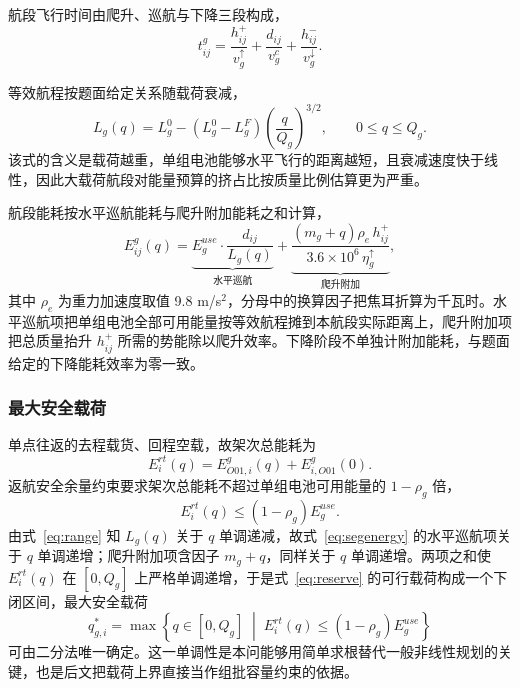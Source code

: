 \documentclass[bwprint]{gmcmthesis}
\begin{document}
航段飞行时间由爬升、巡航与下降三段构成，
\begin{equation}
t_{ij}^{g}=\frac{h_{ij}^{+}}{v_g^{\uparrow}}+\frac{d_{ij}}{v_g^{c}}+\frac{h_{ij}^{-}}{v_g^{\downarrow}}.
\label{eq:segtime}
\end{equation}

等效航程按题面给定关系随载荷衰减，
\begin{equation}
L_g(q)=L_g^{0}-\left(L_g^{0}-L_g^{F}\right)\left(\frac{q}{Q_g}\right)^{3/2},\qquad 0\le q\le Q_g .
\label{eq:range}
\end{equation}
该式的含义是载荷越重，单组电池能够水平飞行的距离越短，且衰减速度快于线性，因此大载荷航段对能量预算的挤占比按质量比例估算更为严重。

航段能耗按水平巡航能耗与爬升附加能耗之和计算，
\begin{equation}
E_{ij}^{g}(q)=\underbrace{E_g^{use}\cdot\frac{d_{ij}}{L_g(q)}}_{\text{水平巡航}}
+\underbrace{\frac{\left(m_g+q\right)\rho_{e}\,h_{ij}^{+}}{3.6\times10^{6}\,\eta_g^{\uparrow}}}_{\text{爬升附加}},
\label{eq:segenergy}
\end{equation}
其中 $\rho_e$ 为重力加速度取值 9.8 m/s$^2$，分母中的换算因子把焦耳折算为千瓦时。水平巡航项把单组电池全部可用能量按等效航程摊到本航段实际距离上，爬升附加项把总质量抬升 $h_{ij}^{+}$ 所需的势能除以爬升效率。下降阶段不单独计附加能耗，与题面给定的下降能耗效率为零一致。

\subsubsection{最大安全载荷}
单点往返的去程载货、回程空载，故架次总能耗为
\begin{equation}
E_{i}^{rt}(q)=E_{O01,i}^{g}(q)+E_{i,O01}^{g}(0).
\label{eq:rtenergy}
\end{equation}
返航安全余量约束要求架次总能耗不超过单组电池可用能量的 $1-\rho_g$ 倍，
\begin{equation}
E_{i}^{rt}(q)\le\left(1-\rho_g\right)E_g^{use}.
\label{eq:reserve}
\end{equation}
由式~\eqref{eq:range} 知 $L_g(q)$ 关于 $q$ 单调递减，故式~\eqref{eq:segenergy} 的水平巡航项关于 $q$ 单调递增；爬升附加项含因子 $m_g+q$，同样关于 $q$ 单调递增。两项之和使 $E_{i}^{rt}(q)$ 在 $[0,Q_g]$ 上严格单调递增，于是式~\eqref{eq:reserve} 的可行载荷构成一个下闭区间，最大安全载荷
\begin{equation}
q^{*}_{g,i}=\max\left\{q\in[0,Q_g]\;\middle|\;E_{i}^{rt}(q)\le\left(1-\rho_g\right)E_g^{use}\right\}
\label{eq:qstar}
\end{equation}
可由二分法唯一确定。这一单调性是本问能够用简单求根替代一般非线性规划的关键，也是后文把载荷上界直接当作组批容量约束的依据。
\end{document}
